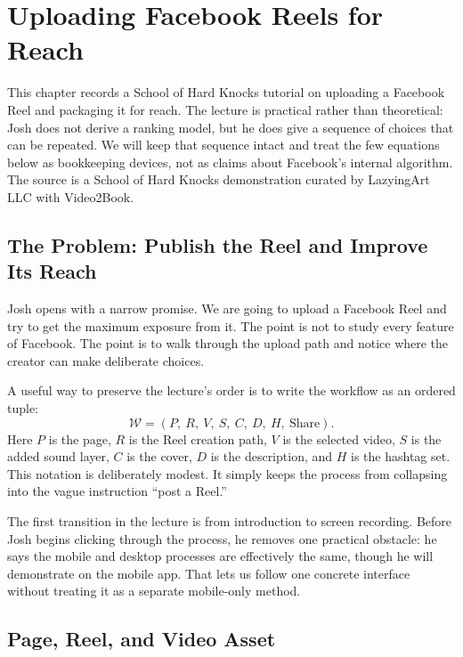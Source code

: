 \chapter{Uploading Facebook Reels for Reach}

This chapter records a School of Hard Knocks tutorial on uploading a Facebook Reel and packaging it for reach. The lecture is practical rather than theoretical: Josh does not derive a ranking model, but he does give a sequence of choices that can be repeated. We will keep that sequence intact and treat the few equations below as bookkeeping devices, not as claims about Facebook's internal algorithm. The source is a School of Hard Knocks demonstration curated by LazyingArt LLC with Video2Book.

\section{The Problem: Publish the Reel and Improve Its Reach}

Josh opens with a narrow promise. We are going to upload a Facebook Reel and try to get the maximum exposure from it. The point is not to study every feature of Facebook. The point is to walk through the upload path and notice where the creator can make deliberate choices.

A useful way to preserve the lecture's order is to write the workflow as an ordered tuple:
\begin{equation}
\mathcal{W}
=
(P,\ R,\ V,\ S,\ C,\ D,\ H,\ \mathrm{Share}).
\end{equation}
Here \(P\) is the page, \(R\) is the Reel creation path, \(V\) is the selected video, \(S\) is the added sound layer, \(C\) is the cover, \(D\) is the description, and \(H\) is the hashtag set. This notation is deliberately modest. It simply keeps the process from collapsing into the vague instruction ``post a Reel.''

The first transition in the lecture is from introduction to screen recording. Before Josh begins clicking through the process, he removes one practical obstacle: he says the mobile and desktop processes are effectively the same, though he will demonstrate on the mobile app. That lets us follow one concrete interface without treating it as a separate mobile-only method.

\section{Page, Reel, and Video Asset}


